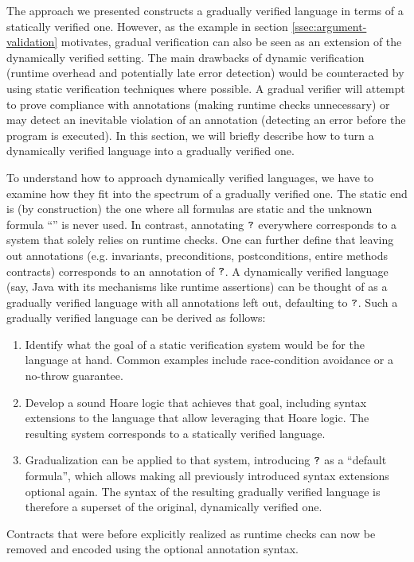 The approach we presented constructs a gradually verified language in terms of a statically verified one.
However, as the example in section \ref{ssec:argument-validation} motivates, gradual verification can also be seen as an extension of the dynamically verified setting.
The main drawbacks of dynamic verification (runtime overhead and potentially late error detection) would be counteracted by using static verification techniques where possible.
A gradual verifier will attempt to prove compliance with annotations (making runtime checks unnecessary) or may detect an inevitable violation of an annotation (detecting an error before the program is executed).
In this section, we will briefly describe how to turn a dynamically verified language into a gradually verified one.

To understand how to approach dynamically verified languages, we have to examine how they fit into the spectrum of a gradually verified one.
The static end is (by construction) the one where all formulas are static and the unknown formula “\qm” is never used.
In contrast, annotating $\textup{\texttt{?}}$ everywhere corresponds to a system that solely relies on runtime checks.
One can further define that leaving out annotations (e.g. invariants, preconditions, postconditions, entire methods contracts) corresponds to an annotation of $\textup{\texttt{?}}$.
A dynamically verified language (say, Java with its mechanisms like runtime assertions) can be thought of as a gradually verified language with all annotations left out, defaulting to $\textup{\texttt{?}}$.
Such a gradually verified language can be derived as follows:

\begin{enumerate}
    \item 
    Identify what the goal of a static verification system would be for the language at hand.
    Common examples include race-condition avoidance or a no-throw guarantee.
    
    \item
    Develop a sound Hoare logic that achieves that goal, including syntax extensions to the language that allow leveraging that Hoare logic.
    The resulting system corresponds to a statically verified language.
    
    \item
    Gradualization can be applied to that system, introducing $\textup{\texttt{?}}$ as a “default formula”, which allows making all previously introduced syntax extensions optional again.
    The syntax of the resulting gradually verified language is therefore a superset of the original, dynamically verified one.
\end{enumerate}

Contracts that were before explicitly realized as runtime checks can now be removed and encoded using the optional annotation syntax.